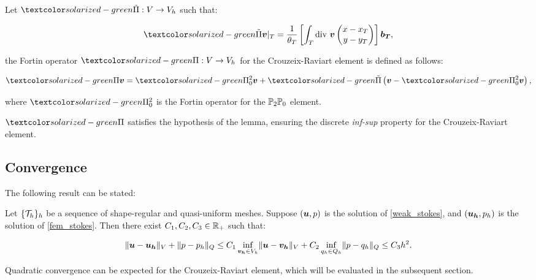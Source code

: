 \newpage
\noindent Let $\tfortin: V \rightarrow V_h$ such that:

\begin{gather}
    \tfortin \Vector{v} \vert_T = \frac{1}{\theta_T} \left[ \int_T \diver \Vector{v} \begin{pmatrix}
        x - x_T \\
        y - y_T
    \end{pmatrix} \right] \Vector{b_T},
\end{gather}

the Fortin operator $\fortin: V \rightarrow V_h$ for the Crouzeix-Raviart element is defined as follows:

\begin{gather}
    \fortin \Vector{v} = \fortinptpz \Vector{v} + \tfortin \left( \Vector{v} - \fortinptpz \Vector{v}\right),
\end{gather}

where $\fortinptpz$ is the Fortin operator for the $\mathbb{P}_{2}\mathbb{P}_{0}$ element.

$\fortin$ satisfies the hypothesis of the  lemma, ensuring the discrete \textit{inf-sup} property for the Crouzeix-Raviart element.

\subsection{Convergence}

The following result can be stated:

\begin{proposition} \label{convergence}
    Let $\{\mathcal{T}_h\}_h$ be a sequence of shape-regular and quasi-uniform meshes. Suppose $(\bm{u}, p)$ is the solution of \eqref{weak_stokes}, and $(\bm{u_h}, p_h)$ is the solution of \eqref{fem_stokes}. Then there exist $C_1, C_2, C_3 \in \mathbb{R}_+$ such that:

    \begin{gather}
        \lVert \bm{u} - \bm{u_h} \rVert_V + \lVert p - p_h \rVert_Q \leq C_1 \inf_{\bm{v_h} \in V_h} \lVert \bm{u} - \bm{v_h} \rVert_V + C_2 \inf_{q_h \in Q_h} \lVert p - q_h \rVert_Q \leq C_3 h^2.
    \end{gather}
\end{proposition}

Quadratic convergence can be expected for the Crouzeix-Raviart element, which will be evaluated in the subsequent section.